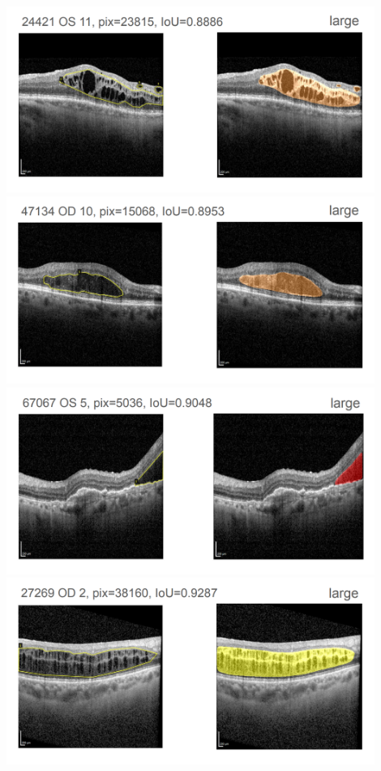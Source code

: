 \includegraphics[width=0.9\textwidth]{./pic/Segmentierung/Segmentierungsergebnisse/45.PNG}
\includegraphics[width=0.9\textwidth]{./pic/Segmentierung/Segmentierungsergebnisse/46.PNG}
\includegraphics[width=0.9\textwidth]{./pic/Segmentierung/Segmentierungsergebnisse/47.PNG}
\includegraphics[width=0.9\textwidth]{./pic/Segmentierung/Segmentierungsergebnisse/48.PNG}

